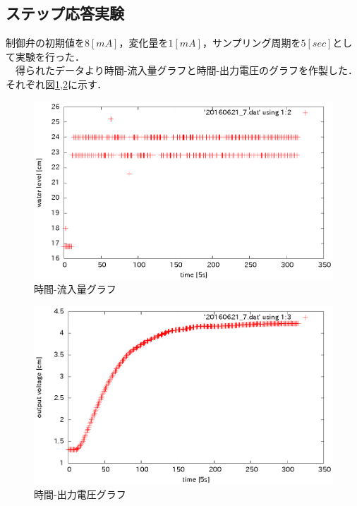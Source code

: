 \documentclass[11pt,a4paper]{jsarticle}
\begin{document}
\newpage

\subsection{ステップ応答実験}
制御弁の初期値を8$[mA]$，変化量を$1[mA]$，サンプリング周期を$5[sec]$として実験を行った． \\
　得られたデータより時間-流入量グラフと時間-出力電圧のグラフを作製した．それぞれ図\ref{fig4},\ref{fig5}に示す．
\begin{figure}[h]
 \begin{center}
  \includegraphics[scale = 1]{./picture/data2_1.eps}
 \end{center}
\caption{時間-流入量グラフ}
\label{fig4}
\end{figure}

\begin{figure}[h]
 \begin{center}
  \includegraphics[scale = 1]{./picture/data2_2.eps}
 \end{center}
\caption{時間-出力電圧グラフ}
\label{fig5}
\end{figure}
\end{document}
